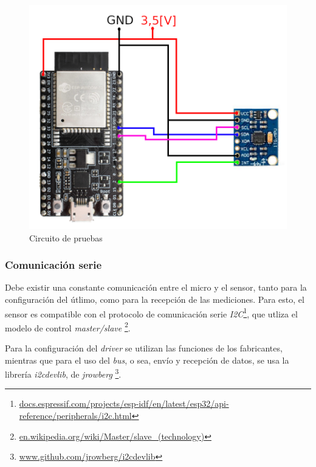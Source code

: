 \documentclass{article}
\newcommand{ \fnidosc }{\footnote{\url{docs.espressif.com/projects/esp-idf/en/latest/esp32/api-reference/peripherals/i2c.html}}}
\newcommand{ \fnmasterslave }{\footnote{\url{en.wikipedia.org/wiki/Master/slave_(technology)}}}
\newcommand{ \fnidoscdevlib }{\footnote{\url{www.github.com/jrowberg/i2cdevlib}}}
\begin{document}
    \begin{figure}[h]
        \includegraphics[width=0.9 \textwidth, center]{circuito.png}
        \caption{Circuito de pruebas}
        \label{fig:circuito}
    \end{figure}

    \subsubsection{Comunicación serie}
    Debe existir una constante comunicación entre el micro y el sensor, tanto 
    para la configuración del útlimo, como para la recepción de las mediciones.
    Para esto, el sensor es compatible con el protocolo de comunicación serie
    \emph{I2C}\fnidosc, que utliza el modelo de control \emph{master/slave}
    \fnmasterslave. \par
    Para la configuración del \emph{driver} se utilizan las funciones de los
    fabricantes, mientras que para el uso del \emph{bus}, o sea, envío y 
    recepción de datos, se usa la librería \emph{i2cdevlib}, de \emph{jrowberg}
    \fnidoscdevlib.
\end{document}
